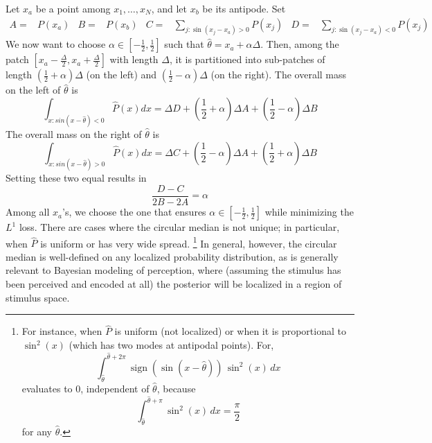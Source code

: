 Let $x_a$ be a point among $x_1, \dots, x_N$, and let $x_b$ be its antipode.
Set
\begin{align*}
    A =& P(x_a) &
    B =& P(x_b) &
    C =& \sum_{j : \sin(x_j-x_a) > 0} P(x_j)&
    D =& \sum_{j : \sin(x_j-x_a) < 0} P(x_j)
\end{align*}
We now want to choose $\alpha \in [-\frac{1}{2},\frac{1}{2}]$ such that $\widehat{\theta} = x_a + \alpha\Delta$.
Then, among the patch $[x_a-\frac{\Delta}{2}, x_a+\frac{\Delta}{2}]$ with length $\Delta$, it is partitioned into sub-patches of length $(\frac{1}{2}+\alpha) \Delta$ (on the left) and $(\frac{1}{2}-\alpha) \Delta$ (on the right).
The overall mass on the left of $\widehat{\theta}$ is
\begin{equation}
  \int_{x : sin(x-\widehat{\theta}) < 0} \widehat{P}(x) dx =  \Delta D + \left(\frac{1}{2}+\alpha\right) \Delta A + \left(\frac{1}{2}-\alpha\right) \Delta B
\end{equation}
The overall mass on the right of $\widehat{\theta}$ is
\begin{equation}
  \int_{x : sin(x-\widehat{\theta}) > 0} \widehat{P}(x) dx =  \Delta C + \left(\frac{1}{2}-\alpha\right) \Delta A + \left(\frac{1}{2}+\alpha\right) \Delta B
\end{equation}
Setting these two equal results in
\begin{equation}\label{eq:median-alpha}
    \frac{D -C}{2B-2A} =   \alpha
\end{equation}
Among all $x_a$'s, we choose the one that ensures $\alpha \in [-\frac{1}{2}, \frac{1}{2}]$ while minimizing the $L^1$ loss. There are cases where the circular median is not unique; in particular, when $\widehat{P}$ is uniform or has very wide spread. 
\footnote{For instance, when $\widehat{P}$ is uniform (not localized) or when it is proportional to $\sin^2(x)$ (which has two modes at antipodal points).
For, 
\[
\int_{\widehat{\theta}}^{\widehat{\theta}+2\pi} \operatorname{sign}(\sin(x-\widehat{\theta}))\,\sin^2(x)\,dx
\]
evaluates to \(0\), independent of \(\widehat{\theta}\), because 
\[
\int_{\widehat{\theta}}^{\widehat{\theta}+\pi} \sin^2(x)\,dx = \frac{\pi}{2}
\] for any $\widehat{\theta}$.
}
In general, however, the circular median is well-defined on any  localized probability distribution, as is generally relevant to Bayesian modeling of perception, where (assuming the stimulus has been perceived and encoded at all) the posterior will be localized in a region of stimulus space. 
